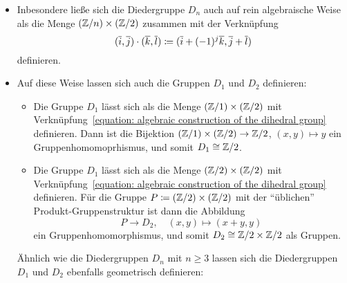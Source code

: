 \begin{itemize}
  \item
    Inbesondere ließe sich die Diedergruppe $D_n$ auch auf rein algebraische Weise als die Menge $(\mathbb{Z}/n) \times (\mathbb{Z}/2)$ zusammen mit der Verknüpfung
    \begin{equation}
      \label{equation: algebraic construction of the dihedral group}
                (\overline{i}, \overline{j}) \cdot (\overline{k}, \overline{l})
      \coloneqq (\overline{i} + (-1)^j \overline{k}, \overline{j} + \overline{l})
    \end{equation}
    definieren.
    
  \item
    Auf diese Weise lassen sich auch die Gruppen $D_1$ und $D_2$ definieren:
    \begin{itemize}
      \item
        Die Gruppe $D_1$ lässt sich als die Menge $(\mathbb{Z}/1) \times (\mathbb{Z}/2)$ mit Verknüpfung~\eqref{equation: algebraic construction of the dihedral group} definieren.
        Dann ist die Bijektion $(\mathbb{Z}/1) \times (\mathbb{Z}/2) \to \mathbb{Z}/2$, $(x,y) \mapsto y$ ein Gruppenhomomoprhismus, und somit $D_1 \cong \mathbb{Z}/2$.
      \item
        Die Gruppe $D_1$ lässt sich als die Menge $(\mathbb{Z}/2) \times (\mathbb{Z}/2)$ mit Verknüpfung~\eqref{equation: algebraic construction of the dihedral group} definieren.
        Für die Gruppe $P \coloneqq (\mathbb{Z}/2) \times (\mathbb{Z}/2)$ mit der \enquote{üblichen} Produkt-Gruppenstruktur ist dann die Abbildung
        \[
                  P
          \to     D_2,
          \quad   (x, y)
          \mapsto (x+y,y)
        \]
        ein Gruppenhomomorphismus, und somit $D_2 \cong \mathbb{Z}/2 \times \mathbb{Z}/2$ als Gruppen.
    \end{itemize}
    
    Ähnlich wie die Diedergruppen $D_n$ mit $n \geq 3$ lassen sich die Diedergruppen $D_1$ und $D_2$ ebenfalls geometrisch definieren:
    

\end{itemize}
